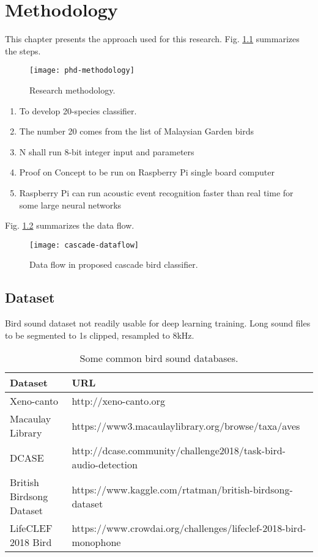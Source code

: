 
\chapter{Methodology}

This chapter presents the approach used for this research.
 Fig. \ref{phd-methodology} summarizes the steps.

\begin{figure}[h]
\centering
\texttt{[image: phd-methodology]}
\caption{Research methodology.}
\label{phd-methodology}
\end{figure}

\begin{enumerate}
\item To develop 20-species classifier.
\item The number 20 comes from the list of Malaysian Garden birds
\item N shall run 8-bit integer input and parameters
\item Proof on Concept to be run on Raspberry Pi single board computer
\item Raspberry Pi can run acoustic event recognition faster than real time for some large neural networks \citep{Ebbers2018}
\end{enumerate}

 Fig. \ref{cascade-dataflow} summarizes the data flow.


\begin{figure}[H]
\centering
\texttt{[image: cascade-dataflow]}
\caption{Data flow in proposed cascade bird classifier.}
\label{cascade-dataflow}
\end{figure}

\section{Dataset}

 Bird sound dataset not readily usable for deep learning training.
Long sound files to be segmented to 1s clipped, resampled to 8kHz.

\begin{table}[h]
    \centering
    \small
    \caption{Some common bird sound databases.}
	\begin{tabular}{ll}
	\toprule
	\textbf{Dataset} & \textbf{URL} \\
	\midrule
	Xeno-canto & http://xeno-canto.org \\
	Macaulay Library & https://www3.macaulaylibrary.org/browse/taxa/aves \\
	DCASE & http://dcase.community/challenge2018/task-bird-audio-detection \\
	British Birdsong Dataset & https://www.kaggle.com/rtatman/british-birdsong-dataset \\
	LifeCLEF 2018 Bird & https://www.crowdai.org/challenges/lifeclef-2018-bird-monophone \\
	\bottomrule
	\end{tabular}
\end{table}	
	


